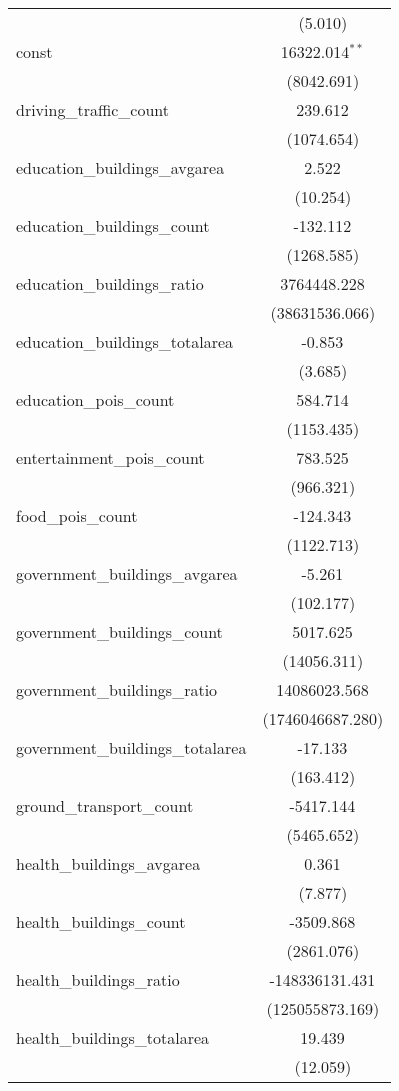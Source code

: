 \begin{table}[!htbp]
\begin{tabular}{@{\extracolsep{5pt}}lc}
  & (5.010) \\
 const & 16322.014$^{**}$ \\
  & (8042.691) \\
 driving_traffic_count & 239.612$^{}$ \\
  & (1074.654) \\
 education_buildings_avgarea & 2.522$^{}$ \\
  & (10.254) \\
 education_buildings_count & -132.112$^{}$ \\
  & (1268.585) \\
 education_buildings_ratio & 3764448.228$^{}$ \\
  & (38631536.066) \\
 education_buildings_totalarea & -0.853$^{}$ \\
  & (3.685) \\
 education_pois_count & 584.714$^{}$ \\
  & (1153.435) \\
 entertainment_pois_count & 783.525$^{}$ \\
  & (966.321) \\
 food_pois_count & -124.343$^{}$ \\
  & (1122.713) \\
 government_buildings_avgarea & -5.261$^{}$ \\
  & (102.177) \\
 government_buildings_count & 5017.625$^{}$ \\
  & (14056.311) \\
 government_buildings_ratio & 14086023.568$^{}$ \\
  & (1746046687.280) \\
 government_buildings_totalarea & -17.133$^{}$ \\
  & (163.412) \\
 ground_transport_count & -5417.144$^{}$ \\
  & (5465.652) \\
 health_buildings_avgarea & 0.361$^{}$ \\
  & (7.877) \\
 health_buildings_count & -3509.868$^{}$ \\
  & (2861.076) \\
 health_buildings_ratio & -148336131.431$^{}$ \\
  & (125055873.169) \\
 health_buildings_totalarea & 19.439$^{}$ \\
  & (12.059) \\

\end{tabular}
\end{table}
